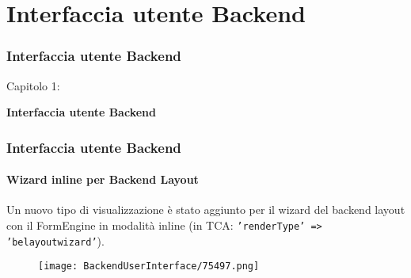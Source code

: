 %

\section{Interfaccia utente Backend}
\begin{frame}[fragile]
	\frametitle{Interfaccia utente Backend}

	\begin{center}\huge{Capitolo 1:}\end{center}
	\begin{center}\huge{\color{typo3darkgrey}\textbf{Interfaccia utente Backend}}\end{center}

\end{frame}

\begin{frame}[fragile]
	\frametitle{Interfaccia utente Backend}
	\framesubtitle{Wizard inline per Backend Layout}

	Un nuovo tipo di visualizzazione è stato aggiunto per il wizard del backend layout con il FormEngine in modalità inline
	(in TCA: \texttt{'renderType' => 'belayoutwizard'}).

	\begin{figure}
		\texttt{[image: BackendUserInterface/75497.png]}
	\end{figure}

\end{frame}


